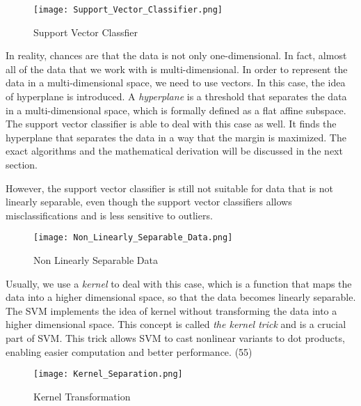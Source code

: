 \begin{figure}[h]%
    \begin{center}%
        \texttt{[image: Support\_Vector\_Classifier.png]}%
        \caption{Support Vector Classfier}\label{fig:}%
    \end{center}%
\end{figure}

In reality, chances are that the data is not only one-dimensional. In fact, almost all of the data that we work with
is multi-dimensional. In order to represent the data in a multi-dimensional space, we need to use vectors. In this case,
the idea of hyperplane is introduced. A \emph{hyperplane} is a threshold that separates the data in a multi-dimensional space,
which is formally defined as a flat affine subspace.\cite{elements} The support vector classifier is able to deal with this case as well.
It finds the hyperplane that separates the data in a way that the margin is maximized. The exact algorithms and the
mathematical derivation will be discussed in the next section.

However, the support vector classifier is still not suitable for data that is not linearly separable, even though 
the support vector classifiers allows misclassifications and is less sensitive to outliers.
\begin{figure}[h]%
    \begin{center}%
        \texttt{[image: Non\_Linearly\_Separable\_Data.png]}%
        \caption{Non Linearly Separable Data}\label{fig:}%
    \end{center}%
\end{figure}

Usually, we use a \emph{kernel} to deal 
with this case, which is a function that maps the data into a higher dimensional space, so that the data becomes linearly
separable. The SVM implements the idea of kernel without transforming the data into a higher dimensional space. This concept is 
called \emph{the kernel trick} and is a crucial part of SVM. This trick allows SVM to cast nonlinear variants to dot products,
enabling easier computation and better performance. (55)\cite{kernel}
\begin{figure}[h]%
    \begin{center}%
        \texttt{[image: Kernel\_Separation.png]}%
        \caption{Kernel Transformation}\label{fig:}%
    \end{center}%
\end{figure}
